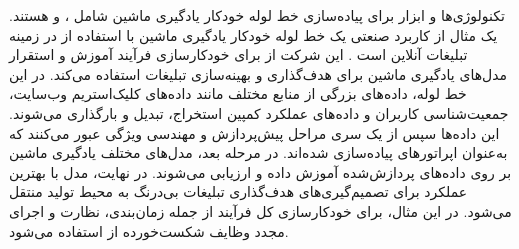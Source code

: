 تکنولوژی‌ها و ابزار برای پیاده‌سازی خط لوله خودکار یادگیری ماشین شامل ،  و  هستند. یک مثال از کاربرد صنعتی یک خط لوله خودکار یادگیری ماشین با استفاده از  در زمینه تبلیغات آنلاین است \cite{MLOpsArch3}. این شرکت از  برای خودکارسازی فرآیند آموزش و استقرار مدل‌های یادگیری ماشین برای هدف‌گذاری و بهینه‌سازی تبلیغات استفاده می‌کند. در این خط لوله، داده‌های بزرگی از منابع مختلف مانند داده‌های کلیک‌استریم وب‌سایت، جمعیت‌شناسی کاربران و داده‌های عملکرد کمپین استخراج، تبدیل و بارگذاری می‌شوند. این داده‌ها سپس از یک سری مراحل پیش‌پردازش و مهندسی ویژگی عبور می‌کنند که به‌عنوان اپراتورهای  پیاده‌سازی شده‌اند. در مرحله بعد، مدل‌های مختلف یادگیری ماشین بر روی داده‌های پردازش‌شده آموزش داده و ارزیابی می‌شوند. در نهایت، مدل با بهترین عملکرد برای تصمیم‌گیری‌های هدف‌گذاری تبلیغات بی‌درنگ به محیط تولید منتقل می‌شود. در این مثال، برای خودکارسازی کل فرآیند از جمله زمان‌بندی، نظارت و اجرای مجدد وظایف شکست‌خورده از  استفاده می‌شود.




